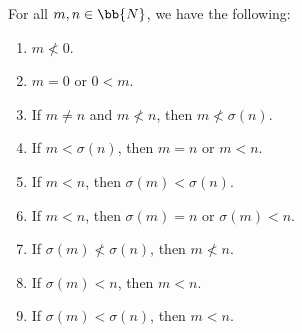 \begin{lemma}\label{ch1thm_peano_order_basic1}
	For all $m, n\in\bb{N}$, we have the following:
	\begin{enumerate}[itemsep=-0.4ex, label=\textup{(\alph*)}]
		\item $m\not < 0$. %
		\item $m = 0$ or $0 < m$. %
		\item If $m\ne n$ and $m \not< n$, then $m \not< \sigma(n)$. %
		\item If $m < \sigma(n)$, then $m = n$ or $m < n$. %
		\item If $m < n$, then $\sigma(m) < \sigma(n)$. %
		\item If $m < n$, then $\sigma(m) = n$ or $\sigma(m) < n$. %
		\item If $\sigma(m)\not < \sigma(n)$, then $m\not < n$.  %
		\item If $\sigma(m) < n$, then $m < n$. %
		\item If $\sigma(m) < \sigma(n)$, then $m < n$. %
	\end{enumerate}
\end{lemma}
